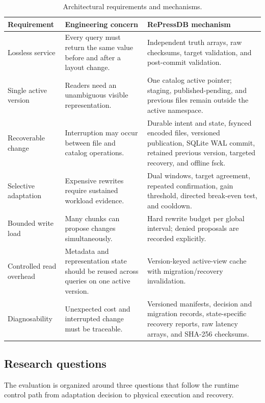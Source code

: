 \documentclass[final,5p,times,twocolumn,authoryear]{elsarticle}
\begin{document}
\begin{table}[t]
\centering
\caption{Architectural requirements and mechanisms.}
\label{tab:requirements}
\begin{tabularx}{\textwidth}{@{}p{}X X@{}}
\toprule
Requirement & Engineering concern & RePressDB mechanism \\
\midrule
Lossless service & Every query must return the same value before and after a layout change. & Independent truth arrays, raw checksums, target validation, and post-commit validation. \\
Single active version & Readers need an unambiguous visible representation. & One catalog active pointer; staging, published-pending, and previous files remain outside the active namespace. \\
Recoverable change & Interruption may occur between file and catalog operations. & Durable intent and state, fsynced encoded files, versioned publication, SQLite WAL commit, retained previous version, targeted recovery, and offline fsck. \\
Selective adaptation & Expensive rewrites require sustained workload evidence. & Dual windows, target agreement, repeated confirmation, gain threshold, directed break-even test, and cooldown. \\
Bounded write load & Many chunks can propose changes simultaneously. & Hard rewrite budget per global interval; denied proposals are recorded explicitly. \\
Controlled read overhead & Metadata and representation state should be reused across queries on one active version. & Version-keyed active-view cache with migration/recovery invalidation. \\
Diagnosability & Unexpected cost and interrupted change must be traceable. & Versioned manifests, decision and migration records, state-specific recovery reports, raw latency arrays, and SHA-256 checksums. \\
\bottomrule
\end{tabularx}
\end{table}

\subsection{Research questions}

The evaluation is organized around three questions that follow the runtime control path from adaptation decision to physical execution and recovery.
\end{document}

